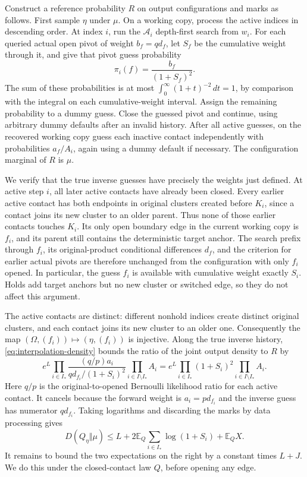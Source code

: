 \documentclass[11pt]{article}
\theoremstyle{definition}
\newcommand{\EE}{\mathbb E}
\begin{document}
Construct a reference probability $R$ on output configurations and marks
as follows. First sample $\eta$ under $\mu$. On a working copy, process
the active indices in descending order. At index $i$, run the
$\mathcal A_i$ depth-first search from $w_i$. For each queried actual open
pivot of weight $b_f=qd_f$, let $S_f$ be the cumulative weight through it,
and give that pivot guess probability
\begin{equation}\label{eq:interpolation-inverse-guess}
 \pi_i(f)=\frac{b_f}{(1+S_f)^2}.
\end{equation}
The sum of these probabilities is at most
$\int_0^\infty(1+t)^{-2}\,dt=1$, by comparison with the integral on
each cumulative-weight interval. Assign the remaining probability to
a dummy guess. Close the guessed pivot and continue, using arbitrary
dummy defaults after an invalid history. After all active guesses, on
the recovered working copy guess each inactive contact independently
with probabilities $a_f/A_i$, again using a dummy default if necessary.
The configuration marginal of $R$ is $\mu$.

We verify that the true inverse guesses have precisely the weights just
defined. At active step $i$, all later active contacts have already been
closed. Every earlier active contact has both endpoints in original
clusters created before $K_i$, since a contact joins its new cluster to
an older parent. Thus none of those earlier contacts touches $K_i$.
Its only open boundary edge in the current working copy is $f_i$, and
its parent still contains the deterministic target anchor. The search
prefix through $f_i$, its original-product conditional differences
$d_f$, and the criterion for earlier actual pivots are therefore unchanged
from the configuration with only $f_i$ opened. In particular, the guess
$f_i$ is available with cumulative weight exactly $S_i$. Holds add target
anchors but no new cluster or switched edge, so they do not affect this
argument.

The active contacts are distinct: different nonhold indices create
distinct original clusters, and each contact joins its new cluster to
an older one. Consequently the map
$(\Omega,(f_i))\mapsto(\eta,(f_i))$ is injective. Along the true inverse
history, \eqref{eq:interpolation-density} bounds the ratio of the joint
output density to $R$ by
\[
 e^L\prod_{i\in I_*}
 \frac{(q/p)a_i}{qd_{f_i}/(1+S_i)^2}
 \prod_{i\in I\setminus I_*}A_i
 =e^L\prod_{i\in I_*}(1+S_i)^2
       \prod_{i\in I\setminus I_*}A_i.
\]
Here $q/p$ is the original-to-opened Bernoulli likelihood ratio for each
active contact. It cancels because the forward weight is $a_i=pd_{f_i}$
and the inverse guess has numerator $qd_{f_i}$.
Taking logarithms and discarding the marks by data processing gives
\begin{equation}\label{eq:interpolation-cost-to-bound}
 D(Q_\eta\Vert\mu)
 \le L+2\EE_Q\sum_{i\in I_*}\log(1+S_i)+\EE_Q X.
\end{equation}
It remains to bound the two expectations on the right by a constant
times $L+J$. We do this under the closed-contact law $Q$, before opening
any edge.
\end{document}
